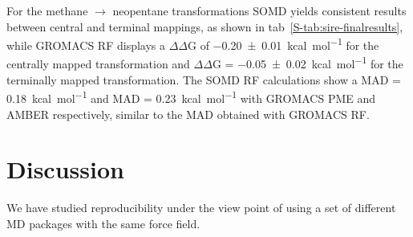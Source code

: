 \documentclass[journal=jctcce,manuscript=article]{achemso}
\begin{document}
For the methane $\rightarrow$ neopentane transformations SOMD yields consistent results between central and terminal mappings, as shown in 
tab~\ref{S-tab:sire-finalresults}, while GROMACS RF displays a $\Delta\Delta$G 
of \SI{-0.20 +-   0.01}{kcal.mol^{-1}} for the centrally mapped transformation 
and $\Delta\Delta$G = \SI{-0.05 +- 0.02}{kcal.mol^{-1}} for the terminally 
mapped transformation. The SOMD RF calculations show a MAD = 
\SI{0.18}{kcal.mol^{-1}} and MAD = \SI{0.23}{kcal.mol^{-1}} with GROMACS PME 
and AMBER respectively, similar to the MAD obtained with GROMACS RF.


\section{Discussion}
\label{sec:discuss}

We have studied reproducibility under the view point of using a set of 
different MD packages with the same force field. %









\end{document}
